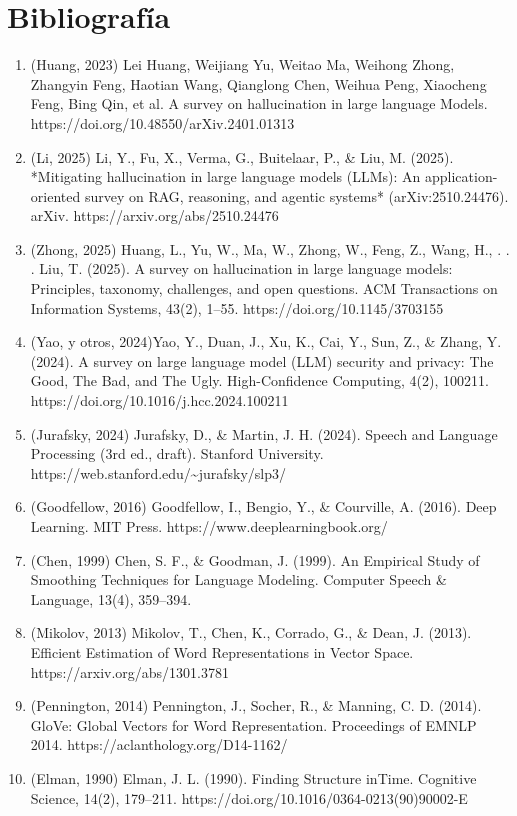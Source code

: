 \chapter*{Bibliografía}
\begin{enumerate}
\item (Huang, 2023) Lei Huang, Weijiang Yu, Weitao Ma, Weihong Zhong, Zhangyin Feng, Haotian Wang, Qianglong Chen, Weihua Peng, Xiaocheng Feng, Bing Qin, et al. A survey on hallucination in large language Models. https://doi.org/10.48550/arXiv.2401.01313
\item (Li, 2025) Li, Y., Fu, X., Verma, G., Buitelaar, P., \& Liu, M. (2025). *Mitigating hallucination in large language models (LLMs): An application-oriented survey on RAG, reasoning, and agentic systems* (arXiv:2510.24476). arXiv. https://arxiv.org/abs/2510.24476
\item (Zhong, 2025) Huang, L., Yu, W., Ma, W., Zhong, W., Feng, Z., Wang, H., . . . Liu, T. (2025). A survey on hallucination in large language models: Principles, taxonomy, challenges, and open questions. ACM Transactions on Information Systems, 43(2), 1--55. https://doi.org/10.1145/3703155
\item (Yao, y otros, 2024)Yao, Y., Duan, J., Xu, K., Cai, Y., Sun, Z., \& Zhang, Y. (2024). A survey on large language model (LLM) security and privacy: The Good, The Bad, and The Ugly. High-Confidence Computing, 4(2), 100211. https://doi.org/10.1016/j.hcc.2024.100211
\item (Jurafsky, 2024) Jurafsky, D., \& Martin, J. H. (2024). Speech and Language Processing (3rd ed., draft). Stanford University. https://web.stanford.edu/\textasciitilde{}jurafsky/slp3/
\item (Goodfellow, 2016) Goodfellow, I., Bengio, Y., \& Courville, A. (2016). Deep Learning. MIT Press. https://www.deeplearningbook.org/
\item (Chen, 1999) Chen, S. F., \& Goodman, J. (1999). An Empirical Study of Smoothing Techniques for Language Modeling. Computer Speech \& Language, 13(4), 359--394.
\item (Mikolov, 2013) Mikolov, T., Chen, K., Corrado, G., \& Dean, J. (2013). Efficient Estimation of Word Representations in Vector Space. https://arxiv.org/abs/1301.3781
\item (Pennington, 2014) Pennington, J., Socher, R., \& Manning, C. D. (2014). GloVe: Global Vectors for Word Representation. Proceedings of EMNLP 2014. https://aclanthology.org/D14-1162/
\item (Elman, 1990) Elman, J. L. (1990). Finding Structure inTime. Cognitive Science, 14(2), 179--211. https://doi.org/10.1016/0364-0213(90)90002-E

\end{enumerate}

